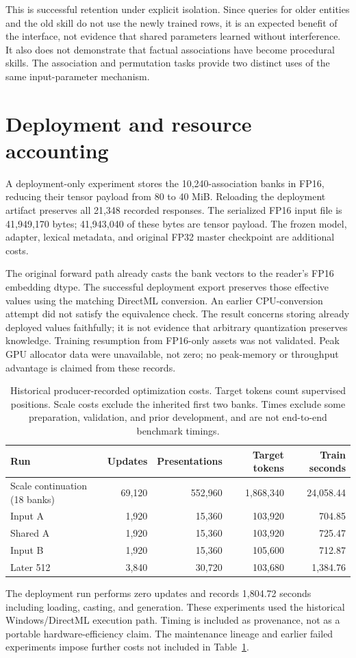 \documentclass[11pt]{article}
\begin{document}
This is successful retention under explicit isolation. Since queries for older entities and the old skill do not use the newly trained rows, it is an expected benefit of the interface, not evidence that shared parameters learned without interference. It also does not demonstrate that factual associations have become procedural skills. The association and permutation tasks provide two distinct uses of the same input-parameter mechanism.

\section{Deployment and resource accounting}
A deployment-only experiment stores the 10,240-association banks in FP16, reducing their tensor payload from 80 to 40 MiB. Reloading the deployment artifact preserves all 21,348 recorded responses. The serialized FP16 input file is 41,949,170 bytes; 41,943,040 of these bytes are tensor payload. The frozen model, adapter, lexical metadata, and original FP32 master checkpoint are additional costs.

The original forward path already casts the bank vectors to the reader's FP16 embedding dtype. The successful deployment export preserves those effective values using the matching DirectML conversion. An earlier CPU-conversion attempt did not satisfy the equivalence check. The result concerns storing already deployed values faithfully; it is not evidence that arbitrary quantization preserves knowledge. Training resumption from FP16-only assets was not validated. Peak GPU allocator data were unavailable, not zero; no peak-memory or throughput advantage is claimed from these records.

\begin{table}[htbp]
\centering\small
\begin{tabular}{lrrrr}
\toprule
Run & Updates & Presentations & Target tokens & Train seconds\\
\midrule
Scale continuation (18 banks)&69,120&552,960&1,868,340&24,058.44\\
Input A&1,920&15,360&103,920&704.85\\
Shared A&1,920&15,360&103,920&725.47\\
Input B&1,920&15,360&105,600&712.87\\
Later 512&3,840&30,720&103,680&1,384.76\\
\bottomrule
\end{tabular}
\caption{Historical producer-recorded optimization costs. Target tokens count supervised positions. Scale costs exclude the inherited first two banks. Times exclude some preparation, validation, and prior development, and are not end-to-end benchmark timings.}
\label{tab:cost}
\end{table}
The deployment run performs zero updates and records 1,804.72 seconds including loading, casting, and generation. These experiments used the historical Windows/DirectML execution path. Timing is included as provenance, not as a portable hardware-efficiency claim. The maintenance lineage and earlier failed experiments impose further costs not included in Table~\ref{tab:cost}.
\end{document}
